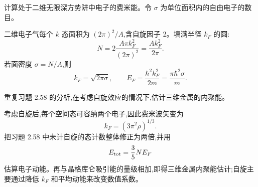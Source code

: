 \begin{question}
计算处于二维无限深方势阱中电子的费米能。令 $\sigma$ 为单位面积内的自由电子的数目。
\end{question}
\begin{solution}

二维电子气每个 $k$ 态面积为 $(2\pi)^2/A$,含自旋因子 2。填满半径 $k_F$ 的圆:
\[
N=2\frac{A\pi k_F^2}{(2\pi)^2}=\frac{A k_F^2}{2\pi}.
\]
若面密度 $\sigma=N/A$,则
\[
k_F=\sqrt{2\pi\sigma},
\qquad
E_F=\frac{\hbar^2k_F^2}{2m}=\frac{\pi\hbar^2\sigma}{m}.
\]

\end{solution}

\begin{question}
重复习题 2.58 的分析,在考虑自旋效应的情况下,估计三维金属的内聚能。
\end{question}
\begin{solution}

考虑自旋后,每个空间态可容纳两个电子,因此费米波矢变为
\[
k_F=(3\pi^2\rho)^{1/3}.
\]
把习题 2.58 中未计自旋的态计数整体修正为两倍,并用
\[
E_{\rm tot}=\frac35NE_F
\]
估算电子动能。再与晶格库仑吸引能的量级相加,即得三维金属内聚能估计;自旋主要通过降低 $k_F$ 和平均动能来改变数值系数。

\end{solution}

